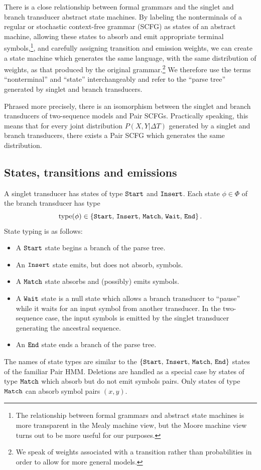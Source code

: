 \documentclass[10pt]{article}
\begin{document}
There is a close relationship between formal grammars and the singlet and branch transducer abstract state machines.
By labeling the nonterminals of a regular or stochastic context-free grammar (SCFG) as states of an abstract machine, allowing these states to absorb and emit 
appropriate terminal symbols,\footnote{The relationship between formal grammars and abstract state machines is more transparent
in the Mealy machine view, but the Moore machine view turns out to be more useful for our purposes.},
and carefully assigning transition and emission weights,
we can create a state machine which generates the same language, with the same distribution of weights, as that produced by the original grammar.\footnote{We speak of
weights associated with a transition rather than probabilities in order to allow for more general models.}
We therefore use the terms ``nonterminal'' and ``state'' interchangeably
and refer to the ``parse tree'' generated by singlet and branch transducers.

Phrased more precisely, there is an isomorphism between the singlet and branch transducers of two-sequence models
and Pair SCFGs.  Practically speaking, this means that for every joint distribution $P(X, Y | \Delta T)$ 
generated by a singlet and branch transducers, there exists a Pair SCFG which generates the same distribution.

\subsection{States, transitions and emissions}
A singlet transducer has states of type $\mathtt{Start}$ and $\mathtt{Insert}$.
Each state $\phi\in\Phi$ of the branch transducer has type
\[ \operatorname{type}(\phi) \in \lbrace\mathtt{Start},\,\mathtt{Insert},\,\mathtt{Match},\,\mathtt{Wait},\,\mathtt{End}\rbrace \, . \]
State typing is as follows:
\begin{itemize}
  \item A $\mathtt{Start}$ state begins a branch of the parse tree.
  \item An $\mathtt{Insert}$ state emits, but does not absorb, symbols.
  \item A $\mathtt{Match}$ state absorbs and (possibly) emits symbols.
  \item A $\mathtt{Wait}$ state is a null state which allows a branch transducer to ``pause''
    while it waits for an input symbol from another transducer.
    In the two-sequence case, the input symbols is emitted by the singlet transducer generating
    the ancestral sequence.
  \item An $\mathtt{End}$ state ends a branch of the parse tree.
\end{itemize}
The names of state types are similar to the $\{\mathtt{Start},\,\mathtt{Insert},\,\mathtt{Match},\,\mathtt{End}\}$ states of the familiar Pair HMM.
Deletions are handled as a special case by states of type $\mathtt{Match}$ which absorb but do not emit symbols pairs.
Only states of type $\mathtt{Match}$ can absorb symbol pairs $(x,y)$.
\end{document}
